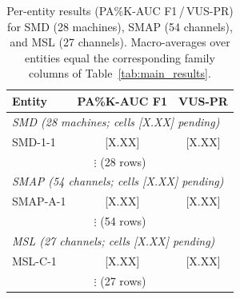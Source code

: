 \begin{table}[h]
\small
\centering
\caption{Per-entity results (PA\%K-AUC F1\,/\,VUS-PR) for SMD (28 machines), SMAP
  (54 channels), and MSL (27 channels).
  Macro-averages over entities equal the corresponding family columns of
  Table~\ref{tab:main_results}.}
\label{tab:per_entity_results}
\begin{tabular}{lcc}
\toprule
Entity & PA\%K-AUC F1 & VUS-PR \\
\midrule
\multicolumn{3}{l}{\textit{SMD (28 machines; cells {[X.XX]} pending)}} \\
SMD-1-1 & {[X.XX]} & {[X.XX]} \\
\multicolumn{3}{c}{$\vdots$ (28 rows)} \\
\midrule
\multicolumn{3}{l}{\textit{SMAP (54 channels; cells {[X.XX]} pending)}} \\
SMAP-A-1 & {[X.XX]} & {[X.XX]} \\
\multicolumn{3}{c}{$\vdots$ (54 rows)} \\
\midrule
\multicolumn{3}{l}{\textit{MSL (27 channels; cells {[X.XX]} pending)}} \\
MSL-C-1 & {[X.XX]} & {[X.XX]} \\
\multicolumn{3}{c}{$\vdots$ (27 rows)} \\
\bottomrule
\end{tabular}
\end{table}
